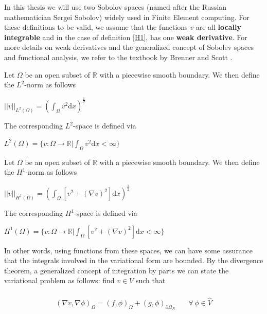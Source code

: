  In this thesis we will use two Sobolov spaces (named after the Russian mathematician Sergei Sobolov) widely used in Finite Element computing. For these definitions to be valid, we assume that the functions $v$ are all \textbf{locally integrable} and in the case of definition \eqref{H1}, has one \textbf{weak derivative}. For more details on weak derivatives and the generalized concept of Sobolev spaces and functional analysis, we refer to the textbook by Brenner and Scott \cite{Bren07}.   
\begin{definition}
Let $\Omega$ be an open subset of $\mathbb{R}$ with a piecewise smooth boundary. We then define the $L^2$-norm as follows\\ \begin{center}
$||v||_{L^2(\Omega)} = (\int_\Omega v^2 \mathrm{d}x)^{\frac{1}{2}}$
\end{center}
The corresponding $L^2$-space is defined via
\begin{center}
$L^2(\Omega) = \{ v:\Omega \rightarrow \mathbb{R} | \int_\Omega v^2 \mathrm{d}x < \infty \}$
\end{center}
\label{L2}
\end{definition}
\begin{definition}
Let $\Omega$ be an open subset of $\mathbb{R}$ with a piecewise smooth boundary. We then define the $H^1$-norm as follows\\ \begin{center}
$||v||_{H^1(\Omega)} = (\int_\Omega [v^2 + (\nabla v)^2]\mathrm{d}x)^{\frac{1}{2}}$
\end{center}
The corresponding $H^1$-space is defined via
\begin{center} $H^1(\Omega) = \{ v:\Omega \rightarrow \mathbb{R} | \int_\Omega [v^2 + (\nabla v)^2] \mathrm{d}x < \infty \}$
\end{center}
\label{H1}
\end{definition}
In other words, using functions from these spaces, we can have some assurance that the integrals involved in the variational form are bounded. 
By the divergence theorem, a generalized concept of integration by parts we can state the variational problem as follows: find $v \in V$ such that \\ \\
\begin{align}
(\nabla v, \nabla \phi)_\Omega = (f,\phi)_\Omega + (g, \phi)_{\partial \Omega_N}& \quad \forall \, \phi \in \hat{V} \label{Weak_form}
\end{align}
\\
